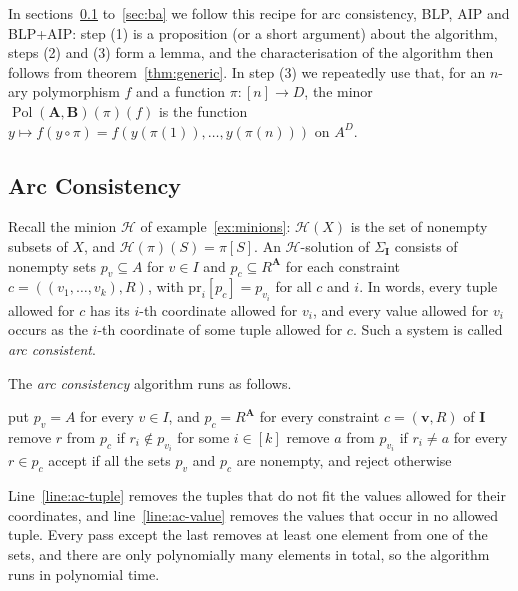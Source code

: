 \documentclass[11pt]{article}
\theoremstyle{plain}
\theoremstyle{definition}
\newcommand{\Pol}{\operatorname{Pol}}
\newcommand{\pr}{\mathrm{pr}}
\newcommand{\bA}{\mathbf{A}}
\newcommand{\bB}{\mathbf{B}}
\newcommand{\bI}{\mathbf{I}}
\newcommand{\Hm}{\mathscr{H}}
\begin{document}
In sections~\ref{sec:ac} to~\ref{sec:ba} we follow this recipe for arc consistency, BLP, AIP and BLP+AIP: step (1) is a proposition (or a short argument) about the algorithm, steps (2) and (3) form a lemma, and the characterisation of the algorithm then follows from theorem~\ref{thm:generic}. In step (3) we repeatedly use that, for an $n$-ary polymorphism $f$ and a function $\pi\colon[n]\to D$, the minor $\Pol(\bA,\bB)(\pi)(f)$ is the function $y\mapsto f(y\circ\pi)=f(y(\pi(1)),\dots,y(\pi(n)))$ on $A^D$.

\subsection{Arc Consistency}\label{sec:ac}

Recall the minion $\Hm$ of example~\ref{ex:minions}: $\Hm(X)$ is the set of nonempty subsets of $X$, and $\Hm(\pi)(S)=\pi[S]$. An $\Hm$-solution of $\Sigma_{\bI}$ consists of nonempty sets $p_v\subseteq A$ for $v\in I$ and $p_c\subseteq R^{\bA}$ for each constraint $c=((v_1,\dots,v_k),R)$, with $\pr_i[p_c]=p_{v_i}$ for all $c$ and $i$. In words, every tuple allowed for $c$ has its $i$-th coordinate allowed for $v_i$, and every value allowed for $v_i$ occurs as the $i$-th coordinate of some tuple allowed for $c$. Such a system is called \emph{arc consistent}.

\noindent\begin{minipage}{\linewidth}
The \emph{arc consistency} algorithm runs as follows.
\begin{algorithmic}[1]
  \State put $p_v=A$ for every $v\in I$, and $p_c=R^{\bA}$ for every constraint $c=(\mathbf v,R)$ of $\bI$
  \Repeat
    \For{every constraint $c=((v_1,\dots,v_k),R)$ of $\bI$}
        \State remove $r$ from $p_c$ if $r_i\notin p_{v_i}$ for some $i\in[k]$\label{line:ac-tuple}
      \EndFor
        \State remove $a$ from $p_{v_i}$ if $r_i\neq a$ for every $r\in p_c$\label{line:ac-value}
      \EndFor
    \EndFor
  \State accept if all the sets $p_v$ and $p_c$ are nonempty, and reject otherwise
\end{algorithmic}
\end{minipage}

Line~\ref{line:ac-tuple} removes the tuples that do not fit the values allowed for their coordinates, and line~\ref{line:ac-value} removes the values that occur in no allowed tuple. Every pass except the last removes at least one element from one of the sets, and there are only polynomially many elements in total, so the algorithm runs in polynomial time.
\end{document}
